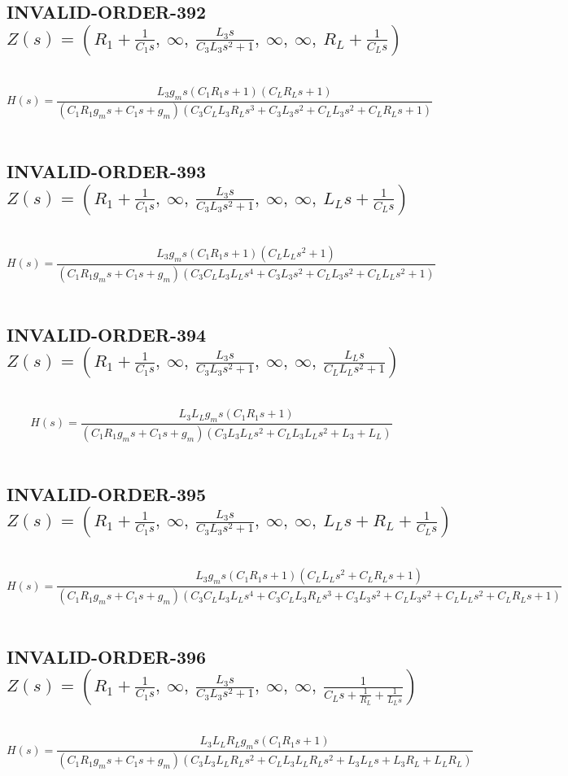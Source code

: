\documentclass{article}
\begin{document}
\subsection{INVALID-ORDER-392 $Z(s) = \left( R_{1} + \frac{1}{C_{1} s}, \  \infty, \  \frac{L_{3} s}{C_{3} L_{3} s^{2} + 1}, \  \infty, \  \infty, \  R_{L} + \frac{1}{C_{L} s}\right)$ } \ 
\textbf{\[H(s) = \frac{L_{3} g_{m} s \left(C_{1} R_{1} s + 1\right) \left(C_{L} R_{L} s + 1\right)}{\left(C_{1} R_{1} g_{m} s + C_{1} s + g_{m}\right) \left(C_{3} C_{L} L_{3} R_{L} s^{3} + C_{3} L_{3} s^{2} + C_{L} L_{3} s^{2} + C_{L} R_{L} s + 1\right)}\] } \ 
\subsection{INVALID-ORDER-393 $Z(s) = \left( R_{1} + \frac{1}{C_{1} s}, \  \infty, \  \frac{L_{3} s}{C_{3} L_{3} s^{2} + 1}, \  \infty, \  \infty, \  L_{L} s + \frac{1}{C_{L} s}\right)$ } \ 
\textbf{\[H(s) = \frac{L_{3} g_{m} s \left(C_{1} R_{1} s + 1\right) \left(C_{L} L_{L} s^{2} + 1\right)}{\left(C_{1} R_{1} g_{m} s + C_{1} s + g_{m}\right) \left(C_{3} C_{L} L_{3} L_{L} s^{4} + C_{3} L_{3} s^{2} + C_{L} L_{3} s^{2} + C_{L} L_{L} s^{2} + 1\right)}\] } \ 
\subsection{INVALID-ORDER-394 $Z(s) = \left( R_{1} + \frac{1}{C_{1} s}, \  \infty, \  \frac{L_{3} s}{C_{3} L_{3} s^{2} + 1}, \  \infty, \  \infty, \  \frac{L_{L} s}{C_{L} L_{L} s^{2} + 1}\right)$ } \ 
\textbf{\[H(s) = \frac{L_{3} L_{L} g_{m} s \left(C_{1} R_{1} s + 1\right)}{\left(C_{1} R_{1} g_{m} s + C_{1} s + g_{m}\right) \left(C_{3} L_{3} L_{L} s^{2} + C_{L} L_{3} L_{L} s^{2} + L_{3} + L_{L}\right)}\] } \ 
\subsection{INVALID-ORDER-395 $Z(s) = \left( R_{1} + \frac{1}{C_{1} s}, \  \infty, \  \frac{L_{3} s}{C_{3} L_{3} s^{2} + 1}, \  \infty, \  \infty, \  L_{L} s + R_{L} + \frac{1}{C_{L} s}\right)$ } \ 
\textbf{\[H(s) = \frac{L_{3} g_{m} s \left(C_{1} R_{1} s + 1\right) \left(C_{L} L_{L} s^{2} + C_{L} R_{L} s + 1\right)}{\left(C_{1} R_{1} g_{m} s + C_{1} s + g_{m}\right) \left(C_{3} C_{L} L_{3} L_{L} s^{4} + C_{3} C_{L} L_{3} R_{L} s^{3} + C_{3} L_{3} s^{2} + C_{L} L_{3} s^{2} + C_{L} L_{L} s^{2} + C_{L} R_{L} s + 1\right)}\] } \ 
\subsection{INVALID-ORDER-396 $Z(s) = \left( R_{1} + \frac{1}{C_{1} s}, \  \infty, \  \frac{L_{3} s}{C_{3} L_{3} s^{2} + 1}, \  \infty, \  \infty, \  \frac{1}{C_{L} s + \frac{1}{R_{L}} + \frac{1}{L_{L} s}}\right)$ } \ 
\textbf{\[H(s) = \frac{L_{3} L_{L} R_{L} g_{m} s \left(C_{1} R_{1} s + 1\right)}{\left(C_{1} R_{1} g_{m} s + C_{1} s + g_{m}\right) \left(C_{3} L_{3} L_{L} R_{L} s^{2} + C_{L} L_{3} L_{L} R_{L} s^{2} + L_{3} L_{L} s + L_{3} R_{L} + L_{L} R_{L}\right)}\] } \ 
\end{document}
